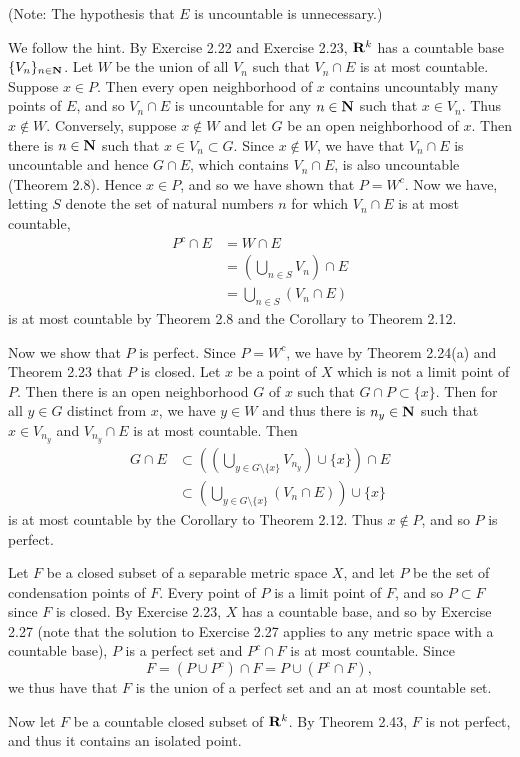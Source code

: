 \begin{ex}
(Note: The hypothesis that $E$ is uncountable is unnecessary.)

We follow the hint. By Exercise 2.22 and Exercise 2.23, $\mathbf{R}^k$ has a countable base $\{V_n\}_{n \in \mathbf{N}}$. Let $W$ be the union of all $V_n$ such that $V_n\cap E$ is at most countable. Suppose $x \in P$. Then every open neighborhood of $x$ contains uncountably many points of $E$, and so $V_n\cap E$ is uncountable for any $n \in \mathbf{N}$ such that $x \in V_n$. Thus $x \not \in W$. Conversely, suppose $x \not \in W$ and let $G$ be an open neighborhood of $x$. Then there is $n \in \mathbf{N}$ such that $x \in V_n \subset G$. Since $x \not \in W$, we have that $V_n\cap E$ is uncountable and hence $G\cap E$, which contains $V_n\cap E$, is also uncountable (Theorem 2.8). Hence $x \in P$, and so we have shown that $P = W^c$. Now we have, letting $S$ denote the set of natural numbers $n$ for which $V_n\cap E$ is at most countable,
\begin{align*}
P^c\cap E & = W\cap E\\
& = \left(\bigcup_{n \in S}V_n\right)\cap E\\
& = \bigcup_{n \in S}(V_n\cap E)
\end{align*}
is at most countable by Theorem 2.8 and the Corollary to Theorem 2.12.

Now we show that $P$ is perfect. Since $P = W^c$, we have by Theorem 2.24(a) and Theorem 2.23 that $P$ is closed. Let $x$ be a point of $X$ which is not a limit point of $P$. Then there is an open neighborhood $G$ of $x$ such that $G\cap P \subset \{x\}$. Then for all $y \in G$ distinct from $x$, we have $y \in W$ and thus there is $n_y \in \mathbf{N}$ such that $x \in V_{n_y}$ and $V_{n_y}\cap E$ is at most countable. Then
\begin{align*}
G\cap E & \subset \left(\left(\bigcup_{y \in G\setminus\{x\}}V_{n_y}\right)\cup\{x\}\right)\cap E\\
& \subset \left(\bigcup_{y \in G\setminus\{x\}}(V_n\cap E)\right)\cup\{x\}
\end{align*}
is at most countable by the Corollary to Theorem 2.12. Thus $x \not \in P$, and so $P$ is perfect.
\end{ex}

\begin{ex}
Let $F$ be a closed subset of a separable metric space $X$, and let $P$ be the set of condensation points of $F$. Every point of $P$ is a limit point of $F$, and so $P \subset F$ since $F$ is closed. By Exercise 2.23, $X$ has a countable base, and so by Exercise 2.27 (note that the solution to Exercise 2.27 applies to any metric space with a countable base), $P$ is a perfect set and $P^c\cap F$ is at most countable. Since \[F = (P\cup P^c)\cap F = P\cup (P^c\cap F),\] we thus have that $F$ is the union of a perfect set and an at most countable set.

Now let $F$ be a countable closed subset of $\mathbf{R}^k$. By Theorem 2.43, $F$ is not perfect, and thus it contains an isolated point.
\end{ex}

